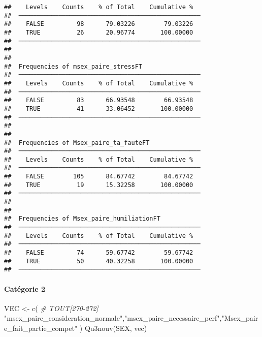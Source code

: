\documentclass[
]{article}
\newenvironment{Shaded}{\begin{snugshade}}{\end{snugshade}}
\newcommand{\CommentTok}[1]{\textcolor[rgb]{0.56,0.35,0.01}{\textit{#1}}}
\newcommand{\FunctionTok}[1]{\textcolor[rgb]{0.00,0.00,0.00}{#1}}
\newcommand{\NormalTok}[1]{#1}
\newcommand{\OtherTok}[1]{\textcolor[rgb]{0.56,0.35,0.01}{#1}}
\newcommand{\StringTok}[1]{\textcolor[rgb]{0.31,0.60,0.02}{#1}}
\begin{document}
\begin{verbatim}
##    Levels    Counts    % of Total    Cumulative %   
##  ────────────────────────────────────────────────── 
##    FALSE         98      79.03226        79.03226   
##    TRUE          26      20.96774       100.00000   
##  ────────────────────────────────────────────────── 
## 
## 
##  Frequencies of msex_paire_stressFT                 
##  ────────────────────────────────────────────────── 
##    Levels    Counts    % of Total    Cumulative %   
##  ────────────────────────────────────────────────── 
##    FALSE         83      66.93548        66.93548   
##    TRUE          41      33.06452       100.00000   
##  ────────────────────────────────────────────────── 
## 
## 
##  Frequencies of Msex_paire_ta_fauteFT               
##  ────────────────────────────────────────────────── 
##    Levels    Counts    % of Total    Cumulative %   
##  ────────────────────────────────────────────────── 
##    FALSE        105      84.67742        84.67742   
##    TRUE          19      15.32258       100.00000   
##  ────────────────────────────────────────────────── 
## 
## 
##  Frequencies of Msex_paire_humiliationFT            
##  ────────────────────────────────────────────────── 
##    Levels    Counts    % of Total    Cumulative %   
##  ────────────────────────────────────────────────── 
##    FALSE         74      59.67742        59.67742   
##    TRUE          50      40.32258       100.00000   
##  ──────────────────────────────────────────────────
\end{verbatim}

\hypertarget{catuxe9gorie-2-3}{%
\paragraph{Catégorie 2}\label{catuxe9gorie-2-3}}

\begin{Shaded}
\begin{Highlighting}[]
\NormalTok{VEC }\OtherTok{\textless{}{-}} \FunctionTok{c}\NormalTok{(   }\CommentTok{\# TOUT[270{-}272]}
  \StringTok{"msex\_paire\_consideration\_normale"}\NormalTok{,}\StringTok{"msex\_paire\_necessaire\_perf"}\NormalTok{,}\StringTok{"Msex\_paire\_fait\_partie\_compet"}
\NormalTok{)}
\FunctionTok{Qu3nouv}\NormalTok{(SEX, vec)}
\end{Highlighting}
\end{Shaded}
\end{document}
